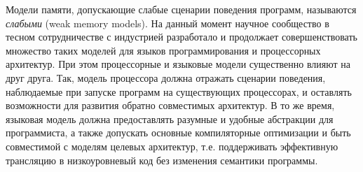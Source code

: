 Модели памяти, допускающие слабые сценарии поведения программ, называются \emph{слабыми}
(weak memory models).
На данный момент научное сообщество в тесном сотрудничестве с индустрией
разработало и продолжает совершенствовать множество таких моделей для
языков программирования и процессорных архитектур.
При этом процессорные и языковые модели существенно влияют на друг друга.
Так, модель процессора должна отражать сценарии поведения, наблюдаемые при запуске программ
на существующих процессорах, и оставлять возможности для развития
обратно совместимых архитектур. В то же время, языковая модель должна
предоставлять разумные и удобные абстракции для программиста, а также допускать основные
компиляторные оптимизации и быть совместимой с моделям целевых архитектур,
т.е. поддерживать эффективную трансляцию в низкоуровневый код без изменения
семантики программы.



